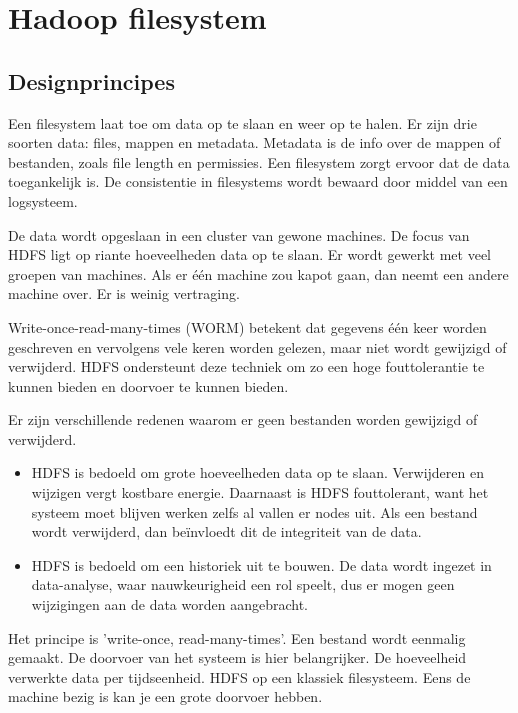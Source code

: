 \documentclass[a4paper,10pt,twoside]{report}
\begin{document}
\section{Hadoop filesystem}

\subsection{Designprincipes}

Een filesystem laat toe om data op te slaan en weer op te halen. Er zijn drie soorten data: files, mappen en metadata. Metadata is de info over de mappen of bestanden, zoals file length en permissies. Een filesystem zorgt ervoor dat de data toegankelijk is. De consistentie in filesystems wordt bewaard door middel van een logsysteem. 

De data wordt opgeslaan in een cluster van gewone machines. De focus van HDFS ligt op riante hoeveelheden data op te slaan. Er wordt gewerkt met veel groepen van machines. Als er één machine zou kapot gaan, dan neemt een andere machine over. Er is weinig vertraging.

Write-once-read-many-times (WORM) betekent dat gegevens één keer worden geschreven en vervolgens vele keren worden gelezen, maar niet wordt gewijzigd of verwijderd. HDFS ondersteunt deze techniek om zo een hoge fouttolerantie te kunnen bieden en doorvoer te kunnen bieden. 

Er zijn verschillende redenen waarom er geen bestanden worden gewijzigd of verwijderd.

\begin{itemize}
	\item HDFS is bedoeld om grote hoeveelheden data op te slaan. Verwijderen en wijzigen vergt kostbare energie. Daarnaast is HDFS fouttolerant, want het systeem moet blijven werken zelfs al vallen er nodes uit. Als een bestand wordt verwijderd, dan beïnvloedt dit de integriteit van de data.
	\item HDFS is bedoeld om een historiek uit te bouwen. De data wordt ingezet in data-analyse, waar nauwkeurigheid een rol speelt, dus er mogen geen wijzigingen aan de data worden aangebracht.
\end{itemize}

Het principe is 'write-once, read-many-times'. Een bestand wordt eenmalig gemaakt. De doorvoer van het systeem is hier belangrijker. De hoeveelheid verwerkte data per tijdseenheid. HDFS op een klassiek filesysteem. Eens de machine bezig is kan je een grote doorvoer hebben. 
\end{document}
